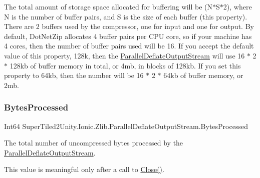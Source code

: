 The total amount of storage space allocated for buffering will be (N$\ast$\+S$\ast$2), where N is the number of buffer pairs, and S is the size of each buffer (this property). There are 2 buffers used by the compressor, one for input and one for output. By default, Dot\+Net\+Zip allocates 4 buffer pairs per C\+PU core, so if your machine has 4 cores, then the number of buffer pairs used will be 16. If you accept the default value of this property, 128k, then the \mbox{\hyperlink{class_super_tiled2_unity_1_1_ionic_1_1_zlib_1_1_parallel_deflate_output_stream}{Parallel\+Deflate\+Output\+Stream}} will use 16 $\ast$ 2 $\ast$ 128kb of buffer memory in total, or 4mb, in blocks of 128kb. If you set this property to 64kb, then the number will be 16 $\ast$ 2 $\ast$ 64kb of buffer memory, or 2mb. \mbox{\label{class_super_tiled2_unity_1_1_ionic_1_1_zlib_1_1_parallel_deflate_output_stream_a98bc1a07f316e85f7db5863904783416}} 
\subsubsection{\texorpdfstring{Bytes\+Processed}{BytesProcessed}}
{\footnotesize\ttfamily Int64 Super\+Tiled2\+Unity.\+Ionic.\+Zlib.\+Parallel\+Deflate\+Output\+Stream.\+Bytes\+Processed\hspace{0.3cm}{\ttfamily [get]}}



The total number of uncompressed bytes processed by the \mbox{\hyperlink{class_super_tiled2_unity_1_1_ionic_1_1_zlib_1_1_parallel_deflate_output_stream}{Parallel\+Deflate\+Output\+Stream}}. 

This value is meaningful only after a call to \mbox{\hyperlink{class_super_tiled2_unity_1_1_ionic_1_1_zlib_1_1_parallel_deflate_output_stream_acb96b7dec375cba963d058ea1d344f64}{Close()}}. \mbox{\label{class_super_tiled2_unity_1_1_ionic_1_1_zlib_1_1_parallel_deflate_output_stream_aad6e98842854428c17f2664bcd600ee3}} 
